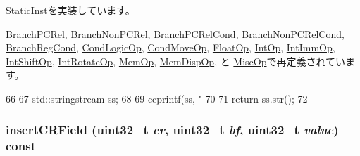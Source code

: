\hyperlink{classStaticInst_ab4a569d2623620c04f8a52bbd91d63b9}{StaticInst}を実装しています。

\hyperlink{classPowerISA_1_1BranchPCRel_a95d323a22a5f07e14d6b4c9385a91896}{BranchPCRel}, \hyperlink{classPowerISA_1_1BranchNonPCRel_a95d323a22a5f07e14d6b4c9385a91896}{BranchNonPCRel}, \hyperlink{classPowerISA_1_1BranchPCRelCond_a95d323a22a5f07e14d6b4c9385a91896}{BranchPCRelCond}, \hyperlink{classPowerISA_1_1BranchNonPCRelCond_a95d323a22a5f07e14d6b4c9385a91896}{BranchNonPCRelCond}, \hyperlink{classPowerISA_1_1BranchRegCond_a95d323a22a5f07e14d6b4c9385a91896}{BranchRegCond}, \hyperlink{classPowerISA_1_1CondLogicOp_a95d323a22a5f07e14d6b4c9385a91896}{CondLogicOp}, \hyperlink{classPowerISA_1_1CondMoveOp_a95d323a22a5f07e14d6b4c9385a91896}{CondMoveOp}, \hyperlink{classPowerISA_1_1FloatOp_a95d323a22a5f07e14d6b4c9385a91896}{FloatOp}, \hyperlink{classPowerISA_1_1IntOp_a3134956ec18bb095818e06eb988f6c55}{IntOp}, \hyperlink{classPowerISA_1_1IntImmOp_a3134956ec18bb095818e06eb988f6c55}{IntImmOp}, \hyperlink{classPowerISA_1_1IntShiftOp_a3134956ec18bb095818e06eb988f6c55}{IntShiftOp}, \hyperlink{classPowerISA_1_1IntRotateOp_a3134956ec18bb095818e06eb988f6c55}{IntRotateOp}, \hyperlink{classPowerISA_1_1MemOp_a95d323a22a5f07e14d6b4c9385a91896}{MemOp}, \hyperlink{classPowerISA_1_1MemDispOp_a95d323a22a5f07e14d6b4c9385a91896}{MemDispOp}, と \hyperlink{classPowerISA_1_1MiscOp_a95d323a22a5f07e14d6b4c9385a91896}{MiscOp}で再定義されています。


\begin{DoxyCode}
66 {
67     std::stringstream ss;
68 
69     ccprintf(ss, "%
70 
71     return ss.str();
72 }
\end{DoxyCode}
\hypertarget{classPowerISA_1_1PowerStaticInst_a37e5ceb738a441d40cfc5ec91bb7c016}{
\subsubsection[{insertCRField}]{ insertCRField ({\bf uint32\_\-t} {\em cr}, \/  {\bf uint32\_\-t} {\em bf}, \/  {\bf uint32\_\-t} {\em value}) const}}
\label{classPowerISA_1_1PowerStaticInst_a37e5ceb738a441d40cfc5ec91bb7c016}



